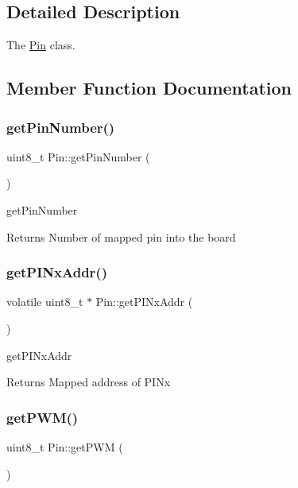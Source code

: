 \subsection{Detailed Description}
The \mbox{\hyperlink{classPin}{Pin}} class. 

\subsection{Member Function Documentation}
\mbox{\label{classPin_aaad2c2cc8ccda03ffe9c07e12323cf4d}} 
\subsubsection{\texorpdfstring{getPinNumber()}{getPinNumber()}}
{\footnotesize\ttfamily uint8\+\_\+t Pin\+::get\+Pin\+Number (\begin{DoxyParamCaption}{ }\end{DoxyParamCaption})}



get\+Pin\+Number 

\begin{DoxyReturn}{Returns}
Number of mapped pin into the board 
\end{DoxyReturn}
\mbox{\label{classPin_ae2d4f832b081cd2d188151a0c4589f8d}} 
\subsubsection{\texorpdfstring{getPINxAddr()}{getPINxAddr()}}
{\footnotesize\ttfamily volatile uint8\+\_\+t $\ast$ Pin\+::get\+P\+I\+Nx\+Addr (\begin{DoxyParamCaption}{ }\end{DoxyParamCaption})}



get\+P\+I\+Nx\+Addr 

\begin{DoxyReturn}{Returns}
Mapped address of P\+I\+Nx 
\end{DoxyReturn}
\mbox{\label{classPin_a5a9c1d0f1937b7083779ca4afba2a607}} 
\subsubsection{\texorpdfstring{getPWM()}{getPWM()}}
{\footnotesize\ttfamily uint8\+\_\+t Pin\+::get\+P\+WM (\begin{DoxyParamCaption}{ }\end{DoxyParamCaption})}



